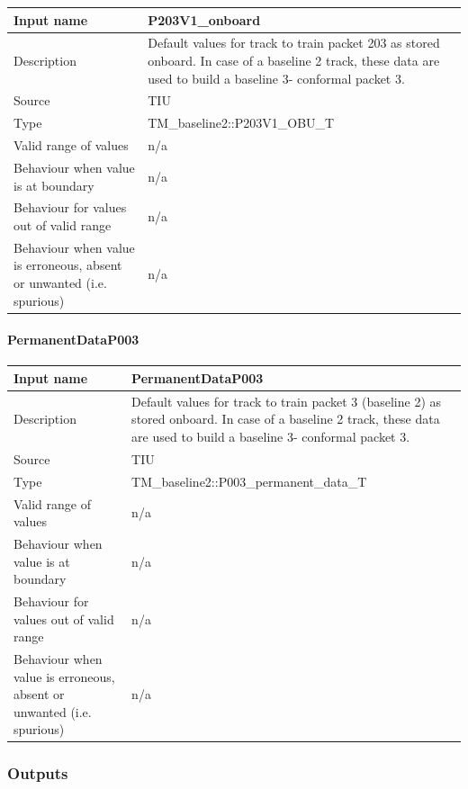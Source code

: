 \begin{longtable}{p{}p{}}
\toprule
Input name				& P203V1\_onboard\\
\midrule
Description				& Default values for track to train packet 203 as stored onboard. In case of a baseline 2 track, these data are used to build a baseline 3- conformal packet 3. \\
\midrule
Source					& TIU\\ 
\midrule
Type					& TM\_baseline2::P203V1\_OBU\_T\\
\midrule
Valid range of values	& n/a \\
\midrule
Behaviour when value is at boundary	& n/a\\
\midrule
Behaviour for values out of valid range	& n/a\\
\midrule
Behaviour when value is erroneous, absent or unwanted (i.e. spurious) & n/a\\

\bottomrule


\end{longtable}

\paragraph{PermanentDataP003}

\begin{longtable}{p{}p{}}
\toprule
Input name				& PermanentDataP003\\
\midrule
Description				& Default values for track to train packet 3 (baseline 2) as stored onboard. In case of a baseline 2 track, these data are used to build a baseline 3- conformal packet 3. \\
\midrule
Source					& TIU\\ 
\midrule
Type					& TM\_baseline2::P003\_permanent\_data\_T\\
\midrule
Valid range of values	& n/a \\
\midrule
Behaviour when value is at boundary	& n/a\\
\midrule
Behaviour for values out of valid range	& n/a\\
\midrule
Behaviour when value is erroneous, absent or unwanted (i.e. spurious) & n/a\\

\bottomrule


\end{longtable}


\subsubsection{Outputs}\label{s:manage_track_data_outputs}

